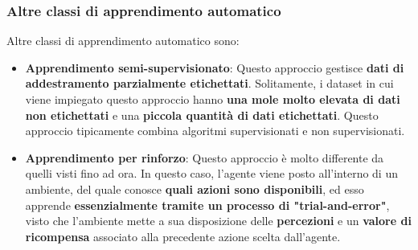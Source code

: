 \documentclass[12pt]{article}
\begin{document}
\subsubsection{Altre classi di apprendimento automatico}
Altre classi di apprendimento automatico sono:
\begin{itemize}
    \item \textbf{Apprendimento semi-supervisionato}: Questo approccio gestisce \textbf{dati di addestramento parzialmente etichettati}. Solitamente, i dataset in cui viene impiegato questo approccio hanno \textbf{una mole molto elevata di dati non etichettati} e una \textbf{piccola quantità di dati etichettati}.
    Questo approccio tipicamente combina algoritmi supervisionati e non supervisionati.
    \item \textbf{Apprendimento per rinforzo}: Questo approccio è molto differente da quelli visti fino ad ora. In questo caso, l'agente viene posto all'interno di un ambiente, del quale conosce \textbf{quali azioni sono disponibili}, ed esso apprende \textbf{essenzialmente tramite un processo di "trial-and-error"}, visto che l'ambiente
    mette a sua disposizione delle \textbf{percezioni} e un \textbf{valore di ricompensa} associato alla precedente azione scelta dall'agente.
\end{itemize}
\end{document}
